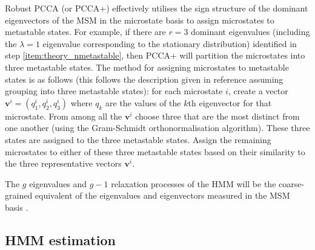 Robust PCCA (or PCCA+) effectively utilises the sign structure of the dominant eigenvectors of the MSM in the microstate basis to assign microstates to metastable states. For example, if there are $r=3$ dominant eigenvalues (including the $\lambda = 1$ eigenvalue corresponding to the stationary distribution) identified in step \ref{item:theory_nmetastable}, then PCCA+ will partition the microstates into three metastable states. The method for assigning microstates to metastable states is as follows (this follows the description given in reference \cite{bowmanQuantitativeComparisonAlternative2013} assuming grouping into three metastable states): for each microstate $i$, create a vector $\mathbf{v}^{i}=(q^{i}_{1}, q^{i}_{2}, q^{i}_{3})$ where $q_{k}$ are the values of the $k$th eigenvector for that microstate. From among all the $\mathbf{v}^{i}$ choose three that are the most distinct from one another (using the Gram-Schmidt orthonormalisation algorithm). These three states are assigned to the three metastable states.  Assign the remaining microstates to either of these three metastable states based on their similarity to the three representative vectors $\mathbf{v}^{i}$. 

The $g$ eigenvalues and $g-1$ relaxation processes of the HMM will be the coarse-grained equivalent of the  eigenvalues and eigenvectors measured in the MSM basis \cite{noeProjectedHiddenMarkov2013a}. 

\subsection{HMM estimation}

